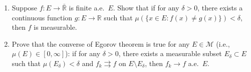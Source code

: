 \documentclass{article}
\begin{document}
\begin{enumerate}


\item Suppose $f: E \to \bar{\mathbb{R}}$ is finite a.e.~$E$. Show that if for any $\delta > 0$, there exists a continuous function $g: E \to \mathbb{R}$ such that $\mu(\{ x\in E: f(x) \ne g(x)\}) < \delta$, then $f$ is measurable.






\item Prove that the converse of Egorov theorem is true for any $E \in \mathcal{M}$ (i.e., $\mu(E) \in [0,\infty]$): if for any $\delta > 0$, there exists a measurable subset $E_{\delta} \subset E$ such that $\mu(E_{\delta}) < \delta$ and $f_{k} \rightrightarrows f$ on $E \setminus E_{\delta}$, then $f_{k} \to f$ a.e.~$E$.





\end{enumerate}
\end{document}
